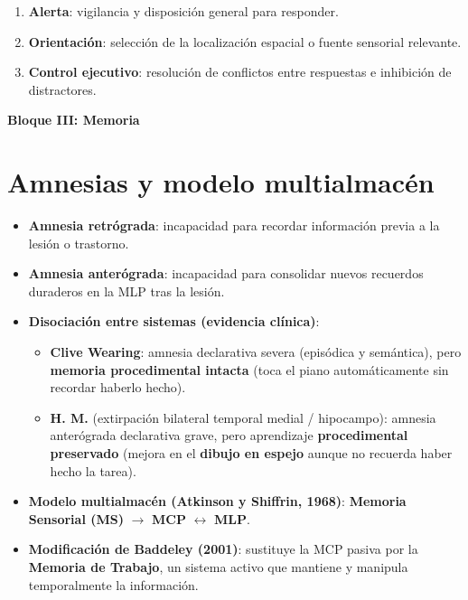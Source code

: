 \documentclass[11pt,a4paper]{article}
\begin{document}
\begin{cajaIdea}[title={Tres redes atencionales (Posner)}]
\begin{enumerate}
  \item \textbf{Alerta}: vigilancia y disposición general para responder.
  \item \textbf{Orientación}: selección de la localización espacial o fuente sensorial relevante.
  \item \textbf{Control ejecutivo}: resolución de conflictos entre respuestas e inhibición de distractores.
\end{enumerate}
\end{cajaIdea}

\newpage
\begin{tcolorbox}[
  colback=Primary,
  colframe=Primary,
  arc=4pt,
  left=14pt, right=14pt, top=10pt, bottom=10pt,
  boxrule=0pt
]
  {\color{white}\LARGE\bfseries Bloque III: Memoria}
\end{tcolorbox}
\setcounter{section}{0}

\section{Amnesias y modelo multialmacén}

\begin{itemize}
  \item \textbf{Amnesia retrógrada}: incapacidad para recordar información previa a la lesión o trastorno.
  \item \textbf{Amnesia anterógrada}: incapacidad para consolidar nuevos recuerdos duraderos en la MLP tras la lesión.
  \item \textbf{Disociación entre sistemas (evidencia clínica)}:
  \begin{itemize}
    \item \textbf{Clive Wearing}: amnesia declarativa severa (episódica y semántica), pero \textbf{memoria procedimental intacta} (toca el piano automáticamente sin recordar haberlo hecho).
    \item \textbf{H. M.} (extirpación bilateral temporal medial / hipocampo): amnesia anterógrada declarativa grave, pero aprendizaje \textbf{procedimental preservado} (mejora en el \textbf{dibujo en espejo} aunque no recuerda haber hecho la tarea).
  \end{itemize}
  \item \textbf{Modelo multialmacén (Atkinson y Shiffrin, 1968)}: \textbf{Memoria Sensorial (MS)} $\rightarrow$ \textbf{MCP} $\leftrightarrow$ \textbf{MLP}.
  \item \textbf{Modificación de Baddeley (2001)}: sustituye la MCP pasiva por la \textbf{Memoria de Trabajo}, un sistema activo que mantiene y manipula temporalmente la información.
\end{itemize}
\end{document}
